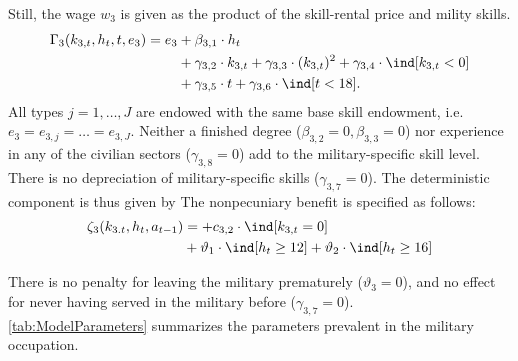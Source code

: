Still, the wage $w_{3}$ is given as the product of the skill-rental price and mility skills.
%
\begin{align}
    \Gamma_3( k_{3,t}, h_t, t, e_3) = e_3 & + \beta_{3,1} \cdot h_t \nonumber \\
	               \nonumber &+ \gamma_{3,2} \cdot  k_{3,t} + \gamma_{3,3} \cdot (k_{3,t})^2 + \gamma_{3,4} \cdot \ind[k_{3,t} < 0] \\
									 & + \gamma_{3,5} \cdot t + \gamma_{3,6} \cdot \ind[t < 18].
\end{align}
%
All types $j = 1, \dots, J$ are endowed with the same base skill endowment, i.e. $e_3 = e_{3,j} = \dots = e_{3, J}$. Neither a finished degree ($\beta_{3,2} = 0, \beta_{3,3} = 0$) nor experience in any of the civilian sectors ($\gamma_{3,8} = 0$) add to the military-specific skill level. There is no depreciation of military-specific skills ($\gamma_{3,7} = 0$). The deterministic component is thus given by
%
The nonpecuniary benefit is specified as follows:
%
\begin{align*}
\zeta_{3}( k_{3.t}, h_t, a_{t-1} )  & =   + c_{3,2} \cdot \ind[k_{3,t} = 0] \nonumber \\
  & + \vartheta_1 \cdot \ind[h_t \geq 12] + \vartheta_2 \cdot \ind[h_t \geq 16]
\end{align*}

There is no penalty for leaving the military prematurely ($\vartheta_3 = 0$), and no effect for never having served in the military before ($\gamma_{3,7} = 0$).\\

\autoref{tab:ModelParameters} summarizes the parameters prevalent in the military occupation.


